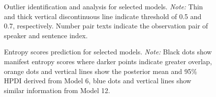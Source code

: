 \documentclass[
  authoryear,
  preprint,
  1p]{elsarticle}
\begin{document}
\label{cell-fig-rq1-model-outliers}
\begin{figure}[H]


\caption{\label{fig-rq1-model-outliers}Outlier identification and
analysis for selected models. \emph{Note:} Thin and thick vertical
discontinuous line indicate threshold of 0.5 and 0.7, respectively.
Number pair texts indicate the observation pair of speaker and sentence
index.}

\end{figure}%

\label{cell-fig-rq3-pred-speaker}
\begin{figure}[H]


\caption{\label{fig-rq3-pred-speaker}Entropy scores prediction for
selected models. \emph{Note:} Black dots show manifest entropy scores
where darker points indicate greater overlap, orange dots and vertical
lines show the posterior mean and 95\% HPDI derived from Model 6, blue
dots and vertical lines show similar information from Model 12.}

\end{figure}%
\end{document}
